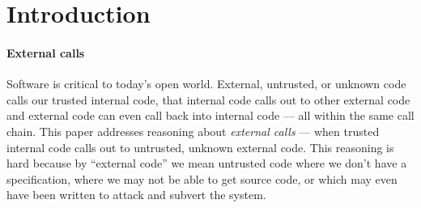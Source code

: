 



\section{Introduction}
\label{s:intro}

\paragraph{External calls}

Software is critical to today's open world. 
External, untrusted, or unknown code calls our trusted internal code, that internal code 
calls out to other external code  and external code can even call back  into internal code --- all within the same call chain.
%
%
This paper addresses reasoning about \emph{external calls} --- when
trusted internal code calls out to untrusted, unknown external code.
This reasoning is hard because by ``external code'' we mean untrusted code
where we don't have a specification,
where we may not be able to get source code, or
which may even have been written to attack and subvert the system.
%
\vspace*{-2mm}
%
%
\newlength{\curparindent}
\setlength{\curparindent}{\parindent}
\noindent
